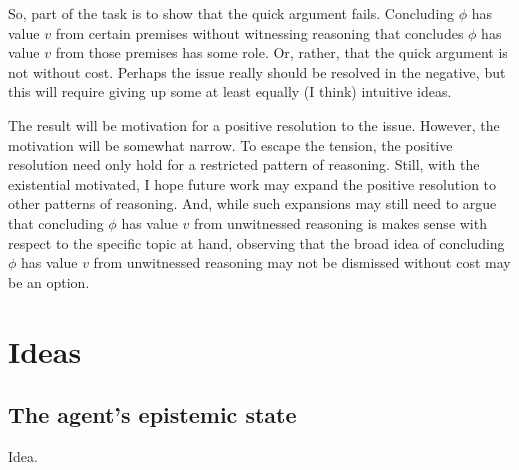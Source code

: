 \begin{note}
  So, part of the task is to show that the quick argument fails.
  Concluding \(\phi\) has value \(v\) from certain premises without witnessing reasoning that concludes \(\phi\) has value \(v\) from those premises has some role.
  Or, rather, that the quick argument is not without cost.
  Perhaps the issue really should be resolved in the negative, but this will require giving up some at least equally (I think) intuitive ideas.

  The result will be motivation for a positive resolution to the issue.
  However, the motivation will be somewhat narrow.
  To escape the tension, the positive resolution need only hold for a restricted pattern of reasoning.
  Still, with the existential motivated, I hope future work may expand the positive resolution to other patterns of reasoning.
  And, while such expansions may still need to argue that concluding \(\phi\) has value \(v\) from unwitnessed reasoning is makes sense with respect to the specific topic at hand, observing that the broad idea of concluding \(\phi\) has value \(v\) from unwitnessed reasoning may not be dismissed without cost may be an option.
\end{note}

\section{Ideas}
\label{sec:ideas-1}

\subsection{The agent's epistemic state}
\label{sec:agents-epist-state}

\begin{note}
  Idea.
\end{note}

